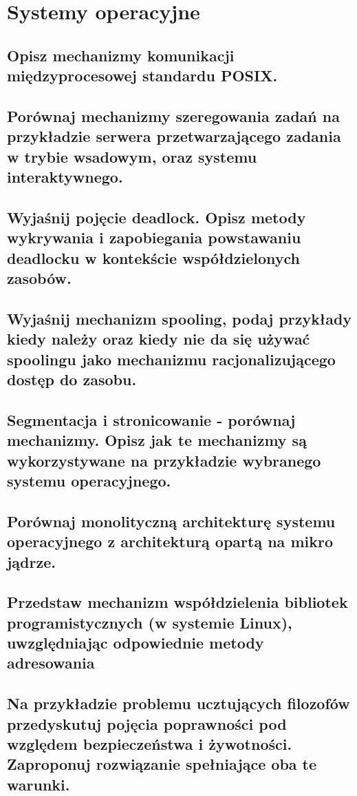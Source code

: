 \chapter{Systemy operacyjne}
\label{sysopy}
\section{Opisz mechanizmy komunikacji międzyprocesowej standardu POSIX.}


\section{Porównaj mechanizmy szeregowania zadań na przykładzie serwera przetwarzającego zadania w trybie wsadowym, oraz systemu interaktywnego.}


\section{Wyjaśnij pojęcie deadlock. Opisz metody wykrywania i zapobiegania powstawaniu deadlocku w kontekście współdzielonych zasobów.}


\section{Wyjaśnij mechanizm spooling, podaj przykłady kiedy należy oraz kiedy nie da się używać spoolingu jako mechanizmu racjonalizującego dostęp do zasobu.}


\section{Segmentacja i stronicowanie - porównaj mechanizmy. Opisz jak te mechanizmy są wykorzystywane na przykładzie wybranego systemu operacyjnego.}


\section{Porównaj monolityczną architekturę systemu operacyjnego z architekturą opartą na mikro jądrze.}


\section{Przedstaw mechanizm współdzielenia bibliotek programistycznych (w systemie Linux), uwzględniając odpowiednie metody adresowania}


\section{Na przykładzie problemu ucztujących filozofów przedyskutuj pojęcia poprawności pod względem bezpieczeństwa i żywotności. Zaproponuj rozwiązanie spełniające oba te warunki.}
